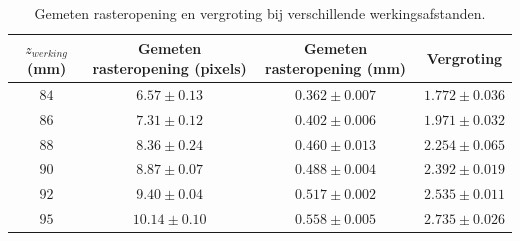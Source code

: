\documentclass[we,twoside,openright,a4paper,11pt]{uantwerpenbamathesis}
\begin{document}
\begin{table}[H]
    \centering
    \begin{tabular}{@{}cccc@{}}
    \toprule
    $z_{werking}$ (mm) & Gemeten rasteropening (pixels) & Gemeten rasteropening (mm) & Vergroting \\ \midrule
    \multicolumn{1}{|c|}{$84$} & \multicolumn{1}{c|}{$6.57 \pm 0.13$}  & \multicolumn{1}{c|}{$0.362 \pm 0.007$} & \multicolumn{1}{c|}{$1.772 \pm 0.036$} \\ \midrule
    \multicolumn{1}{|c|}{$86$} & \multicolumn{1}{c|}{$7.31 \pm 0.12$}  & \multicolumn{1}{c|}{$0.402 \pm 0.006$} & \multicolumn{1}{c|}{$1.971 \pm 0.032$} \\ \midrule
    \multicolumn{1}{|c|}{$88$} & \multicolumn{1}{c|}{$8.36 \pm 0.24$}  & \multicolumn{1}{c|}{$0.460 \pm 0.013$} & \multicolumn{1}{c|}{$2.254 \pm 0.065$} \\ \midrule
    \multicolumn{1}{|c|}{$90$} & \multicolumn{1}{c|}{$8.87 \pm 0.07$}  & \multicolumn{1}{c|}{$0.488 \pm 0.004$} & \multicolumn{1}{c|}{$2.392 \pm 0.019$} \\ \midrule
    \multicolumn{1}{|c|}{$92$} & \multicolumn{1}{c|}{$9.40 \pm 0.04$}  & \multicolumn{1}{c|}{$0.517 \pm 0.002$} & \multicolumn{1}{c|}{$2.535 \pm 0.011$} \\ \midrule
    \multicolumn{1}{|c|}{$95$} & \multicolumn{1}{c|}{$10.14 \pm 0.10$} & \multicolumn{1}{c|}{$0.558 \pm 0.005$} & \multicolumn{1}{c|}{$2.735 \pm 0.026$} \\ \bottomrule
    \end{tabular}
    \caption{Gemeten rasteropening en vergroting bij verschillende werkingsafstanden.}
    \label{tb:vergroting_werkingsafstand}
\end{table}
\end{document}
